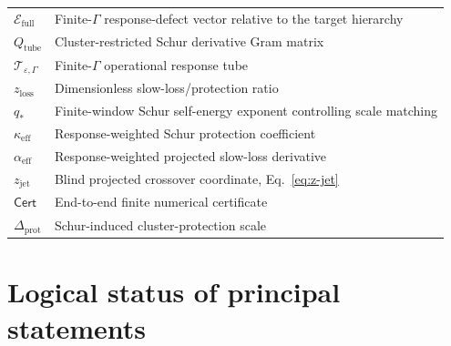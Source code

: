 \documentclass[11pt]{article}
\theoremstyle{definition}
\theoremstyle{remark}
\newcommand{\eps}{\varepsilon}
\newcommand{\cT}{\mathcal T}
\newcommand{\cE}{\mathcal E}
\begin{document}
\begin{longtable}{>{\raggedright\arraybackslash}p{} >{\raggedright\arraybackslash}p{}}
$\cE_{\mathrm{full}}$ & Finite-$\Gamma$ response-defect vector relative to the target hierarchy\\
$Q_{\mathrm{tube}}$ & Cluster-restricted Schur derivative Gram matrix\\
$\cT_{\eps,\Gamma}$ & Finite-$\Gamma$ operational response tube\\
$z_{\mathrm{loss}}$ & Dimensionless slow-loss/protection ratio\\
$q_*$ & Finite-window Schur self-energy exponent controlling scale matching\\
$\kappa_{\mathrm{eff}}$ & Response-weighted Schur protection coefficient\\
$\alpha_{\mathrm{eff}}$ & Response-weighted projected slow-loss derivative\\
$z_{\mathrm{jet}}$ & Blind projected crossover coordinate, Eq.~\eqref{eq:z-jet}\\
$\mathsf{Cert}$ & End-to-end finite numerical certificate\\
$\Delta_{\mathrm{prot}}$ & Schur-induced cluster-protection scale\\
\bottomrule
\end{longtable}

\section{Logical status of principal statements}
\end{document}
